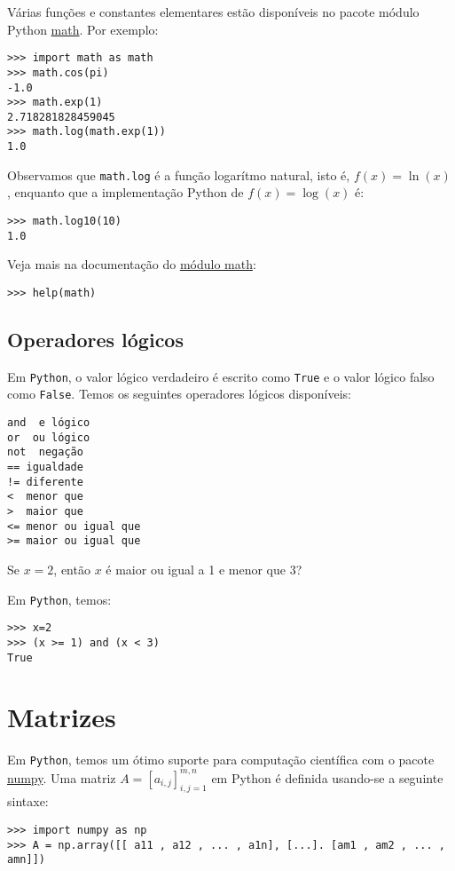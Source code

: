 Várias funções e constantes elementares estão disponíveis no pacote módulo Python \href{https://docs.python.org/3/library/math.html?highlight=math#module-math}{math}. Por exemplo:
\begin{verbatim}
>>> import math as math
>>> math.cos(pi)
-1.0
>>> math.exp(1)
2.718281828459045
>>> math.log(math.exp(1))
1.0
\end{verbatim}

Observamos que \verb+math.log+ é a função logarítmo natural, isto é, $f(x) = \ln(x)$, enquanto que a implementação Python de $f(x) = \log(x)$ é:
\begin{verbatim}
>>> math.log10(10)
1.0
\end{verbatim}
Veja mais na documentação do \href{https://docs.python.org/3/library/math.html?highlight=math#module-math}{módulo math}:
\begin{verbatim}
>>> help(math)
\end{verbatim}

\subsection{Operadores lógicos}

Em \verb+Python+, o valor lógico verdadeiro é escrito como \verb+True+ e o valor lógico falso como \verb+False+. Temos os seguintes operadores lógicos disponíveis:
\begin{verbatim}
and  e lógico
or  ou lógico
not  negação
== igualdade
!= diferente
<  menor que
>  maior que
<= menor ou igual que
>= maior ou igual que
\end{verbatim}

\begin{ex}
  Se $x=2$, então $x$ é maior ou igual a 1 e menor que 3? 
\end{ex}
\begin{sol}
  Em \verb+Python+, temos:
\begin{verbatim}
>>> x=2
>>> (x >= 1) and (x < 3)
True
\end{verbatim}
\end{sol}

\section{Matrizes}

Em \verb+Python+, temos um ótimo suporte para computação científica com o pacote \href{http://www.numpy.org/}{numpy}. Uma matriz $A = [a_{i,j}]_{i,j=1}^{m,n}$ em Python é definida usando-se a seguinte sintaxe:
\begin{verbatim}
>>> import numpy as np
>>> A = np.array([[ a11 , a12 , ... , a1n], [...]. [am1 , am2 , ... , amn]])
\end{verbatim}

